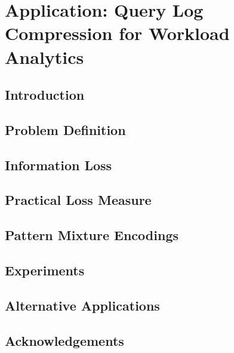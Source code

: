 \chapter{Application: Query Log Compression for Workload Analytics}

\section{Introduction}


\section{Problem Definition}
\label{sec:problemdefinition}


\section{Information Loss}
\label{sec:analyzingsummaries}


\section{Practical Loss Measure}
\label{sec:practicalrepresentativeness}


\section{Pattern Mixture Encodings}


\section{Experiments}
\label{sec:experiments}


\section{Alternative Applications}
\label{sec:evaluatingalternativeapplications}


%

%

\balance

\section{Acknowledgements}
